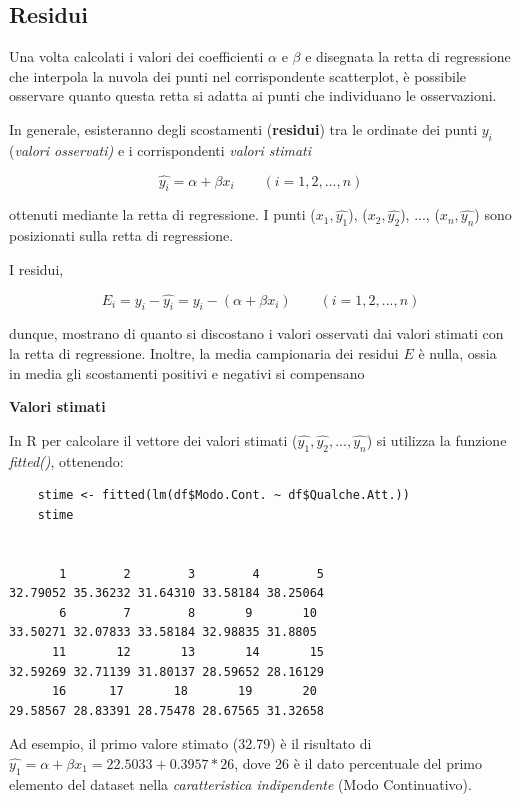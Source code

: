 \subsection{Residui}\label{cap4.2.1}

Una volta calcolati i valori dei coefficienti $\alpha$ e $\beta$ e disegnata la retta di regressione che interpola la nuvola dei punti nel corrispondente scatterplot, è possibile osservare quanto questa retta si adatta ai punti che individuano le osservazioni. 

In generale, esisteranno degli scostamenti (\textbf{residui}) tra le ordinate dei punti $y_i$ (\textit{valori osservati)} e i corrispondenti \textit{valori stimati}

\[\hat{y_i} = \alpha + \beta x_i \quad \quad (i = 1, 2, ..., n)\]

ottenuti mediante la retta di regressione. I punti ($x_1, \hat{y_1}$), ($x_2, \hat{y_2}$), ..., ($x_n, \hat{y_n}$) sono posizionati sulla retta di regressione. 

I residui,

\[E_i = y_i - \hat{y_i} = y_i - (\alpha + \beta x_i) \quad \quad (i = 1, 2, ..., n)\]

dunque, mostrano di quanto si discostano i valori osservati dai valori stimati con la retta di regressione. Inoltre, la media campionaria dei residui $E$ è nulla, ossia in media gli scostamenti positivi e negativi si compensano

\noindent \textbf{Valori stimati}

In R per calcolare il vettore dei valori stimati ($\hat{y_1}, \hat{y_2}, ..., \hat{y_n}$) si utilizza la funzione \textit{fitted()}, ottenendo:

\vspace{5mm}
\begin{lstlisting}
    stime <- fitted(lm(df$Modo.Cont. ~ df$Qualche.Att.))
    stime


       1        2        3        4        5 
32.79052 35.36232 31.64310 33.58184 38.25064 
       6        7        8       9       10 
33.50271 32.07833 33.58184 32.98835 31.8805 
      11       12       13       14       15
32.59269 32.71139 31.80137 28.59652 28.16129
      16      17       18       19       20 
29.58567 28.83391 28.75478 28.67565 31.32658 
\end{lstlisting}
\vspace{5mm}

Ad esempio, il primo valore stimato (32.79) è il risultato di $\hat{y_1} = \alpha + \beta x_1 = 22.5033 + 0.3957 * 26$, dove 26 è il dato percentuale del primo elemento del dataset nella \textit{caratteristica indipendente} (Modo Continuativo).

